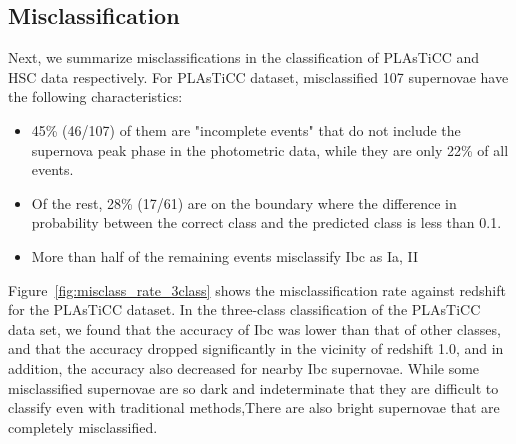 \documentclass[useamsfonts]{pasj01}
\begin{document}
\subsection{Misclassification}
\label{sec:misclass}
%
Next, we summarize misclassifications in the classification of PLAsTiCC and HSC data respectively.
For PLAsTiCC dataset, misclassified 107 supernovae have the following characteristics:
\begin{itemize}
\item 45\% (46/107) of them are "incomplete events" that do not include the supernova peak phase in the photometric data, while they are only 22\% of all events.
\item Of the rest, 28\% (17/61) are on the boundary where the difference in probability between the correct class and the predicted class is less than 0.1.
\item More than half of the remaining events misclassify Ibc as Ia, II
\end{itemize}
Figure\ \ref{fig:misclass_rate_3class} shows the misclassification rate against redshift for the PLAsTiCC dataset.
In the three-class classification of the PLAsTiCC data set, we found that the accuracy of Ibc was lower than that of other classes, and that the accuracy dropped significantly in the vicinity of redshift 1.0, and in addition, the accuracy also decreased for nearby Ibc supernovae.
While some misclassified supernovae are so dark and indeterminate that they are difficult to classify even with traditional methods,There are also bright supernovae that are completely misclassified.
\end{document}
